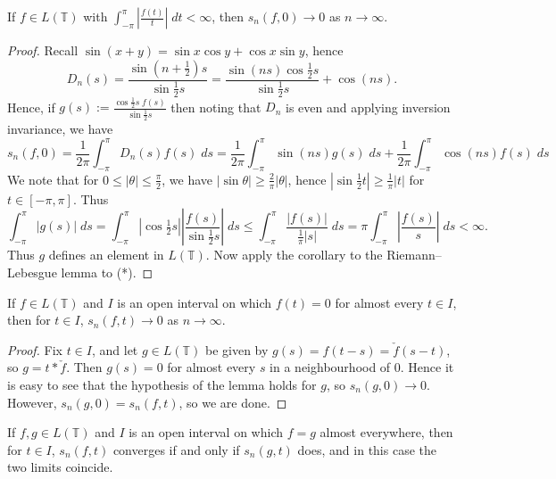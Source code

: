 \begin{lemma}
If $f \in L(\mathbb{T})$ with $\displaystyle \int_{-\pi}^\pi \left| \frac{f(t)}{t} \right| \; dt < \infty$, then $s_n(f,0) \to 0$ as $n \to \infty$.
\end{lemma}

\begin{proof}
Recall $\sin(x+y) = \sin x \cos y + \cos x \sin y$, hence
\[ D_n(s) = \frac{\sin(n+\tfrac{1}{2})s}{\sin \tfrac{1}{2}s} = \frac{\sin(ns) \cos \tfrac{1}{2} s}{\sin \tfrac{1}{2} s} + \cos(ns). \]
Hence, if $\displaystyle g(s) := \frac{\cos \tfrac{1}{2} s \; f(s)}{\sin \tfrac{1}{2} s}$ then noting that $D_n$ is even and applying inversion invariance, we have
\[ s_n(f,0) = \frac{1}{2\pi} \int_{-\pi}^\pi D_n(s) f(s) \; ds = \frac{1}{2\pi} \int_{-\pi}^\pi \sin(ns) g(s) \; ds + \frac{1}{2\pi} \int_{-\pi}^\pi \cos(ns) f(s) \; ds \tag{*} \]
We note that for $0 \leq | \theta | \leq \tfrac{\pi}{2}$, we have $|\sin \theta| \geq \tfrac{2}{\pi} |\theta|$, hence $|\sin \tfrac{1}{2} t| \geq \tfrac{1}{\pi} |t|$ for $t \in [-\pi,\pi]$. Thus
\[ \int_{-\pi}^\pi |g(s)| \; ds = \int_{-\pi}^\pi |\cos \tfrac{1}{2}s| \left| \frac{f(s)}{\sin \tfrac{1}{2} s} \right| \; ds \leq \int_{-\pi}^\pi \frac{|f(s)|}{\tfrac{1}{\pi} |s|} \; ds = \pi \int_{-\pi}^\pi \left| \frac{f(s)}{s} \right| \; ds < \infty. \]
Thus $g$ defines an element in $L(\mathbb{T})$. Now apply the corollary to the Riemann--Lebesgue lemma to (*).
\end{proof}

\begin{theorem}
If $f \in L(\mathbb{T})$ and $I$ is an open interval on which $f(t) = 0$ for almost every $t \in I$, then for $t \in I$, $s_n(f,t) \to 0$ as $n \to \infty$.
\end{theorem}

\begin{proof}
Fix $t \in I$, and let $g \in L(\mathbb{T})$ be given by $g(s) = f(t-s) = \check{f}(s-t)$, so $g = t * \check{f}$. Then $g(s) = 0$ for almost every $s$ in a neighbourhood of 0. Hence it is easy to see that the hypothesis of the lemma holds for $g$, so $s_n(g,0) \to 0$. However, $s_n(g,0) = s_n(f,t)$, so we are done.
\end{proof}

\begin{corollary}
If $f, g \in L(\mathbb{T})$ and $I$ is an open interval on which $f=g$ almost everywhere, then for $t \in I$, $s_n(f,t)$ converges if and only if $s_n(g,t)$ does, and in this case the two limits coincide.
\end{corollary}

